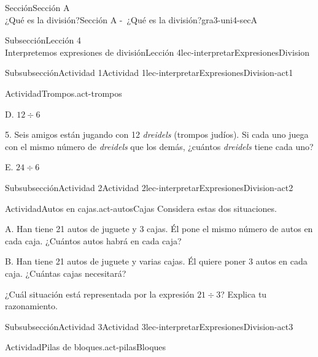 \begin{sectionptx}{Sección}{{\Large Sección A\\}¿Qué es la división?}{}{Sección A -~¿Qué es la división?}{}{}{gra3-uni4-secA}
\begin{subsectionptx}{Subsección}{{\normalsize Lección 4\\[-0.05cm]}Interpretemos expresiones de división}{}{Lección 4}{}{}{lec-interpretarExpresionesDivision}
\begin{subsubsectionptx}{Subsubsección}{Actividad 1}{}{Actividad 1}{}{}{lec-interpretarExpresionesDivision-act1}
\begin{activity}{Actividad}{Trompos.}{act-trompos}
\begin{sidebyside}{2}{0.05}{0}{0.15}
\begin{sbspanel}{0.2}
\par
D. \(12 \div 6\)%
\end{sbspanel}%
\end{sidebyside}%
\begin{sidebyside}{2}{0.05}{0}{0.15}%
\begin{sbspanel}{0.6}%
5. Seis amigos están jugando con 12 \emph{dreidels} (trompos judíos). Si cada uno juega con el mismo número de \emph{dreidels} que los demás, ¿cuántos \emph{dreidels} tiene cada uno?%
\end{sbspanel}%
\begin{sbspanel}{0.2}%
\par
E. \(24 \div 6\)%
\end{sbspanel}%
\end{sidebyside}%
\end{activity}%
\end{subsubsectionptx}
%
%
\typeout{************************************************}
\typeout{************************************************}
%
\begin{subsubsectionptx}{Subsubsección}{Actividad 2}{}{Actividad 2}{}{}{lec-interpretarExpresionesDivision-act2}
\begin{activity}{Actividad}{Autos en cajas.}{act-autosCajas}%
Considera estas dos situaciones.%
\begin{sidebyside}{2}{0.05}{0.05}{0.1}%
\begin{sbspanel}{0.4}%
A. Han tiene 21 autos de juguete y 3 cajas. Él pone el mismo número de autos en cada caja. ¿Cuántos autos habrá en cada caja?%
\end{sbspanel}%
\begin{sbspanel}{0.4}%
\par
B. Han tiene 21 autos de juguete y varias cajas. Él quiere poner 3 autos en cada caja. ¿Cuántas cajas necesitará?%
\end{sbspanel}%
\end{sidebyside}%
\par
¿Cuál situación está representada por la expresión \(21\div 3\)? Explica tu razonamiento.%
\end{activity}%
\end{subsubsectionptx}
%
%
\typeout{************************************************}
\typeout{************************************************}
%
\begin{subsubsectionptx}{Subsubsección}{Actividad 3}{}{Actividad 3}{}{}{lec-interpretarExpresionesDivision-act3}
\begin{activity}{Actividad}{Pilas de bloques.}{act-pilasBloques}%

\end{activity}
\end{subsubsectionptx}
\end{subsectionptx}
\end{sectionptx}
